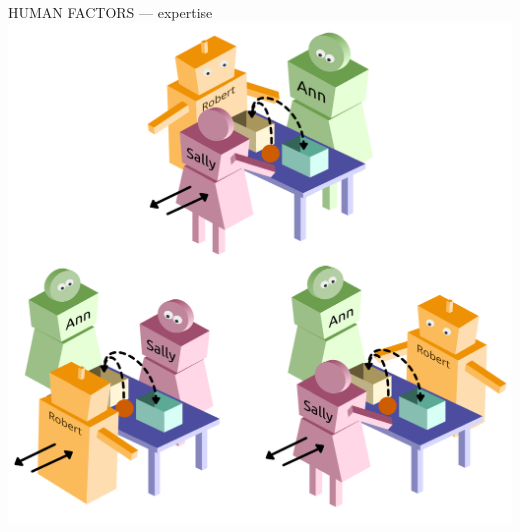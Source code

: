 \documentclass[xcolor=table]{beamer}
\begin{document}
\begin{frame}{HUMAN FACTORS --- expertise}
            \hyperlink{constructs}{\includegraphics[height=0.2\paperheight]{triadic_false_beliefs}}
\end{frame}
\end{document}
